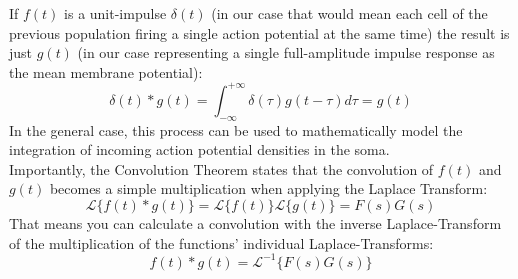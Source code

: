 \begin{remark}[Convolution]
%
%
%
    If $f(t)$ is a unit-impulse $\delta(t)$ (in our case that would mean each cell of the previous population firing a
    single action potential at the same time) the result is just $g(t)$ (in our case representing a
    single full-amplitude impulse response as the mean membrane potential):
    \[\delta(t) \ast g(t)= \int_{-\infty}^{+\infty}\delta(\tau)g(t-\tau) d\tau = g(t)\]
    In the general case, this process can be used to mathematically model the integration of
    incoming action potential densities in the soma.\\[1em]
    Importantly, the Convolution Theorem states that the convolution of $f(t)$ and $g(t)$ becomes a
    simple multiplication when applying the Laplace Transform:
    \[\mathscr{L}\{f(t) \ast g(t)\}= \mathscr{L}\{f(t)\}\mathscr{L}\{g(t)\} = F(s)G(s)\]
    That means you can calculate a convolution with the inverse Laplace-Transform of the multiplication of
    the functions' individual Laplace-Transforms:
    \[f(t) \ast g(t)= \mathscr{L}^{-1}\{F(s)G(s)\}\]

\end{remark}

